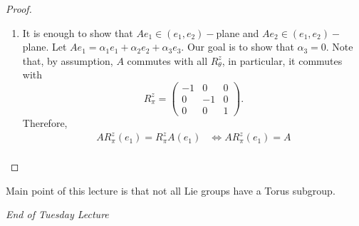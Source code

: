 \begin{proof}
\begin{enumerate}
    \item[(1)] It is enough to show that \( A {e}_{1} \in ({e}_{1}, {e}_{2})- \)plane and \( A {e}_{2} \in ({e}_{1} , {e}_{2})- \)plane. Let \( A {e}_{1} = {\alpha}_{1} {e}_{1} + {\alpha}_{2} {e}_{2} + {\alpha}_{3} {e}_{3} \). Our goal is to show that \( {\alpha}_{3} = 0  \). Note that, by assumption, \( A  \) commutes with all \( {R}_{\theta}^{z} \), in particular, it commutes with 
        \[ {R}_{\pi}^{z} = \begin{pmatrix} -1 & 0 & 0 \\ 0 & -1 & 0  \\ 0 & 0 & 1  \end{pmatrix}.  \]
        Therefore, 
        \begin{align*}
            A {R}_{\pi}^{z}({e}_{1}) = {R}_{\pi}^{z} A ({e}_{1}) &\iff A {R}_{\pi}^{z} ({e}_{1}) = A   \\
        \end{align*}
\end{enumerate}
\end{proof}

Main point of this lecture is that not all Lie groups have a Torus subgroup.

\begin{center}
    \textit{End of Tuesday Lecture} 
\end{center}

